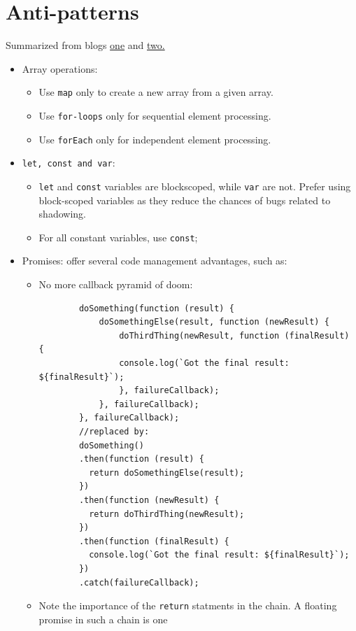 \documentclass{report}
\begin{document}
\section{Anti-patterns}
Summarized from blogs \href{https://dev.to/medhatdawoud/javascript-anti-patterns-2nia}{one} and \href{https://javascript.plainenglish.io/javascript-anti-patterns-we-do-every-day-3d0086e2910}{two.}
\begin{itemize}
\item Array operations:
    \begin{itemize}
        \item Use \texttt{map} only to create a new array from a given array.
        \item Use \texttt{for-loops} only for sequential element processing.
        \item Use \texttt{forEach} only for independent element processing.
    \end{itemize}
\item \texttt{let, const and var}:
    \begin{itemize}
        \item \texttt{let} and \texttt{const} variables are blockscoped, while \texttt{var} are not. Prefer using block-scoped variables as they reduce the chances of bugs related to shadowing.
        \item For all constant variables, use \texttt{const};
    \end{itemize}
\item Promises: offer several code management advantages, such as:
\begin{itemize}
    \item No more callback pyramid of doom:
    \begin{lstlisting}
        doSomething(function (result) {
            doSomethingElse(result, function (newResult) {
                doThirdThing(newResult, function (finalResult) {
                console.log(`Got the final result: ${finalResult}`);
                }, failureCallback);
            }, failureCallback);
        }, failureCallback);
        //replaced by:
        doSomething()
        .then(function (result) {
          return doSomethingElse(result);
        })
        .then(function (newResult) {
          return doThirdThing(newResult);
        })
        .then(function (finalResult) {
          console.log(`Got the final result: ${finalResult}`);
        })
        .catch(failureCallback);
    \end{lstlisting}
    \item Note the importance of the \texttt{return} statments in the chain. A floating promise in such a chain is one

\end{itemize}
\end{itemize}
\end{document}
